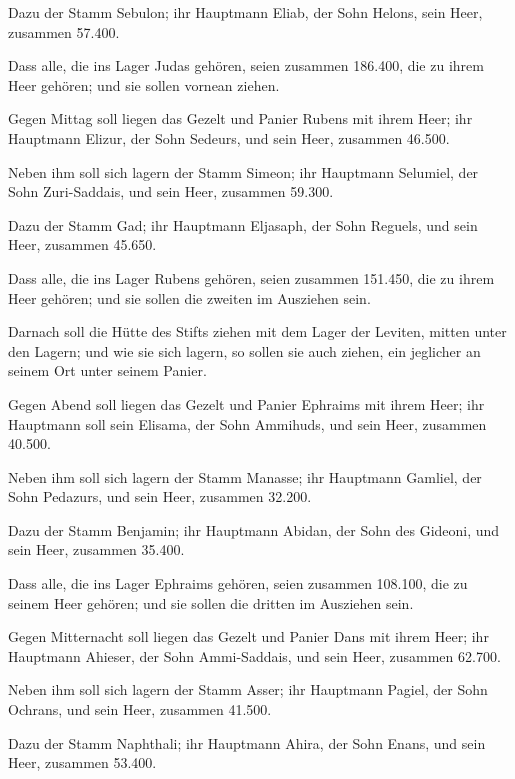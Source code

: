  Dazu der Stamm Sebulon; ihr Hauptmann Eliab, der Sohn
Helons,  sein Heer, zusammen 57.400.

 Dass alle, die ins Lager Judas gehören, seien zusammen
186.400, die zu ihrem Heer gehören; und sie sollen vornean ziehen.

 Gegen Mittag soll liegen das Gezelt und Panier Rubens mit
ihrem Heer; ihr Hauptmann Elizur, der Sohn Sedeurs,  und
sein Heer, zusammen 46.500.

 Neben ihm soll sich lagern der Stamm Simeon; ihr Hauptmann
Selumiel, der Sohn Zuri-Saddais,  und sein Heer, zusammen
59.300.

 Dazu der Stamm Gad; ihr Hauptmann Eljasaph, der Sohn
Reguels,  und sein Heer, zusammen 45.650.

 Dass alle, die ins Lager Rubens gehören, seien zusammen
151.450, die zu ihrem Heer gehören; und sie sollen die zweiten im
Ausziehen sein.

 Darnach soll die Hütte des Stifts ziehen mit dem Lager der
Leviten, mitten unter den Lagern; und wie sie sich lagern, so sollen sie
auch ziehen, ein jeglicher an seinem Ort unter seinem Panier.

 Gegen Abend soll liegen das Gezelt und Panier Ephraims mit
ihrem Heer; ihr Hauptmann soll sein Elisama, der Sohn Ammihuds,
 und sein Heer, zusammen 40.500.

 Neben ihm soll sich lagern der Stamm Manasse; ihr
Hauptmann Gamliel, der Sohn Pedazurs,  und sein Heer,
zusammen 32.200.

 Dazu der Stamm Benjamin; ihr Hauptmann Abidan, der Sohn
des Gideoni,  und sein Heer, zusammen 35.400.

 Dass alle, die ins Lager Ephraims gehören, seien zusammen
108.100, die zu seinem Heer gehören; und sie sollen die dritten im
Ausziehen sein.

 Gegen Mitternacht soll liegen das Gezelt und Panier Dans
mit ihrem Heer; ihr Hauptmann Ahieser, der Sohn Ammi-Saddais,
 und sein Heer, zusammen 62.700.

 Neben ihm soll sich lagern der Stamm Asser; ihr Hauptmann
Pagiel, der Sohn Ochrans,  und sein Heer, zusammen 41.500.

 Dazu der Stamm Naphthali; ihr Hauptmann Ahira, der Sohn
Enans,  und sein Heer, zusammen 53.400.

